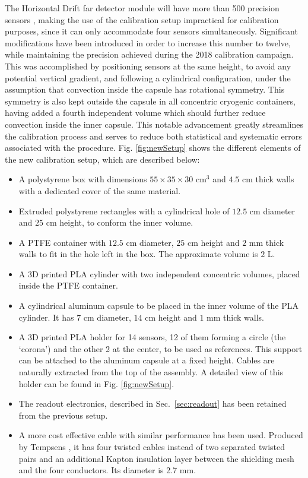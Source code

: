 \noindent The Horizontal Drift far detector module will have more than 500 precision sensors \cite{dune_tdr4}, making the use of the calibration setup impractical for calibration purposes, since it can only accommodate four sensors simultaneously. Significant modifications have been introduced in order to increase this number to twelve, while maintaining the precision achieved during the 2018 calibration campaign. This was accomplished by positioning sensors at the same height, to avoid any potential vertical gradient, and following a cylindrical configuration, under the assumption that convection inside the capsule has rotational symmetry.
This symmetry is also kept outside the capsule in all concentric cryogenic containers, having added a fourth independent volume which should further reduce convection inside the inner capsule.
This notable advancement greatly streamlines the calibration process and serves to reduce both statistical and systematic errors associated with the procedure. Fig. \ref{fig:newSetup} shows the different elements of the new calibration setup, which are described below:

\begin{itemize}
    \item A polystyrene box with dimensions $55\times35\times30$ cm$^{3}$ and $4.5$ cm thick walls with a dedicated cover of the same material.
    \item Extruded polystyrene rectangles with a cylindrical hole of $12.5$ cm diameter and $25$ cm height, to conform the inner volume.
    \item A PTFE container with $12.5$ cm diameter, $25$ cm height and $2$ mm thick walls to fit in the hole left in the box. The approximate volume is $2$ L.
    \item A 3D printed PLA cylinder with two independent concentric volumes, placed inside the PTFE container.
    \item A cylindrical aluminum capsule to be placed in the inner volume of the PLA cylinder. It has $7$ cm diameter,  $14$ cm height and $1$ mm thick walls.
    \item A 3D printed PLA holder for 14 sensors, 12 of them forming a circle (the `corona') and the other 2 at the center, to be used as references. This support can be attached to the aluminum capsule at a fixed height. Cables are naturally extracted from the top of the assembly. A detailed view of this holder can be found in Fig. \ref{fig:newSetup}.
    \item The readout electronics, described in Sec.~\ref{sec:readout} has been retained from the previous setup.
    \item A more cost effective cable with similar performance has been used. Produced by Tempsens \cite{tempsens}, it has four twisted cables instead of two separated twisted pairs and an additional Kapton insulation layer between the shielding mesh and the four conductors. Its diameter is 2.7 mm.
\end{itemize}

